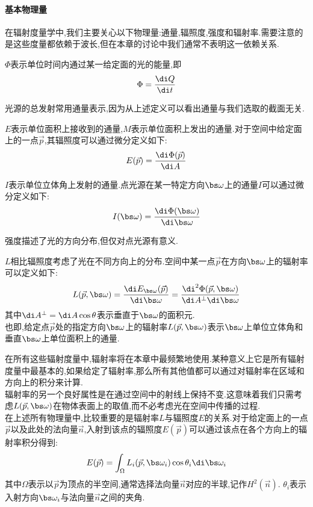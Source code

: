 \documentclass{ctexart}
\begin{document}
\paragraph{基本物理量}
在辐射度量学中,我们主要关心以下物理量:通量,辐照度,强度和辐射率.需要注意的是这些度量都依赖于波长,但在本章的讨论中我们通常不表明这一依赖关系.
\begin{definition}[通量]
    $\Phi$表示单位时间内通过某一给定面的光的能量,即
    \[\Phi=\dfrac{\di Q}{\di t}\]
\end{definition}
光源的总发射常用通量表示,因为从上述定义可以看出通量与我们选取的截面无关.
\begin{definition}[辐照度与辐射出射度]
    $E$表示单位面积上接收到的通量,$M$表示单位面积上发出的通量.对于空间中给定面上的一点$\vec{p}$,其辐照度可以通过微分定义如下:
    \[E(\vec{p})=\dfrac{\di \Phi(\vec{p})}{\di A}\]
\end{definition}
\begin{definition}[强度]
    $I$表示单位立体角上发射的通量.点光源在某一特定方向$\bs\omega$上的通量$I$可以通过微分定义如下:
    \[I(\bs\omega)=\dfrac{\di \Phi(\bs\omega)}{\di\bs\omega}\]
\end{definition}
强度描述了光的方向分布,但仅对点光源有意义.
\begin{definition}[辐射率]
    $L$相比辐照度考虑了光在不同方向上的分布.空间中某一点$\vec{p}$在方向$\bs\omega$上的辐射率可以定义如下:
    \[L(\vec{p},\bs\omega)=\dfrac{\di E_{\bs\omega}(\vec{p})}{\di\bs\omega}=\dfrac{\di^2\Phi(\vec{p},\bs\omega)}{\di A^\bot\di\bs\omega}\]
    其中$\di A^\bot=\di A\cos\theta$表示垂直于$\bs\omega$的面积元.\\
    也即,给定点$\vec{p}$处的指定方向$\bs\omega$上的辐射率$L(\vec{p},\bs\omega)$表示$\bs\omega$上单位立体角和垂直$\bs\omega$上单位面积上的通量.
\end{definition}
在所有这些辐射度量中,辐射率将在本章中最频繁地使用.某种意义上它是所有辐射度量中最基本的,如果给定了辐射率,那么所有其他值都可以通过对辐射率在区域和方向上的积分来计算.\\
\indent 辐射率的另一个良好属性是在通过空间中的射线上保持不变.这意味着我们只需考虑$L(\vec{p},\bs\omega)$在物体表面上的取值,而不必考虑光在空间中传播的过程.\\
\indent 在上述所有物理量中,比较重要的是辐射率$L$与辐照度$E$的关系.对于给定面上的一点$\vec{p}$以及此处的法向量$\vec{n}$,入射到该点的辐照度$E(\vec{p})$可以通过该点在各个方向上的辐射率积分得到:
\[E(\vec{p})=\int_{\Omega}L_i(\vec{p},\bs\omega_i)\cos\theta_i\di\bs\omega_i\]
其中$\Omega$表示以$\vec{p}$为顶点的半空间,通常选择法向量$\vec{n}$对应的半球,记作$H^2(\vec{n})$. $\theta_i$表示入射方向$\bs\omega_i$与法向量$\vec{n}$之间的夹角.
\end{document}
